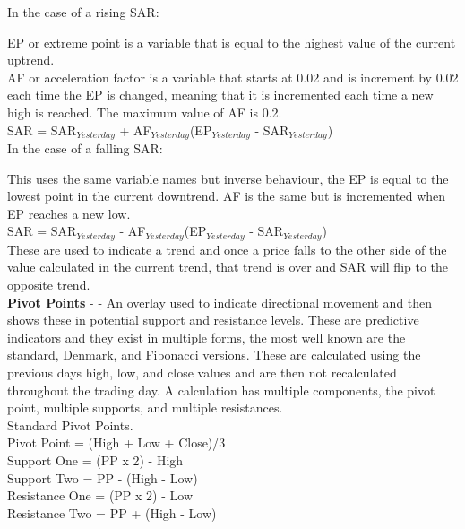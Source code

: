 \documentclass[12pt,a4paper]{article}
\begin{document}
\noindent
In the case of a rising SAR:

\noindent
EP or extreme point is a variable that is equal to the highest value of the current uptrend.\\
AF or acceleration factor is a variable that starts at 0.02 and is increment by 0.02 each time the EP is changed, meaning that it is incremented each time a new high is reached. The maximum value of AF is 0.2. \\

\noindent
SAR = SAR$_{Yesterday}$ + AF$_{Yesterday}$(EP$_{Yesterday}$ - SAR$_{Yesterday}$) \\

\noindent
In the case of a falling SAR:

\noindent
This uses the same variable names but inverse behaviour, the EP is equal to the lowest point in the current downtrend. AF is the same but is incremented when EP reaches a new low. \\

\noindent
SAR = SAR$_{Yesterday}$ - AF$_{Yesterday}$(EP$_{Yesterday}$ - SAR$_{Yesterday}$) \\

\noindent
These are used to indicate a trend and once a price falls to the other side of the value calculated in the current trend, that trend is over and SAR will flip to the opposite trend. \\

\iffalse
[]
\fi

\noindent
\textbf{Pivot Points} - \cite{Murphy1999} - An overlay used to indicate directional movement and then shows these in potential support and resistance levels. These are predictive indicators and they exist in multiple forms, the most well known are the standard, Denmark, and Fibonacci versions. These are calculated using the previous days high, low, and close values and are then not recalculated throughout the trading day. A calculation has multiple components, the pivot point, multiple supports, and multiple resistances.\\

\noindent
Standard Pivot Points. \\
Pivot Point = (High + Low + Close)/3\\
Support One = (PP x 2) - High\\
Support Two = PP - (High - Low)\\
Resistance One = (PP x 2) - Low\\
Resistance Two = PP + (High - Low)\\
\end{document}
